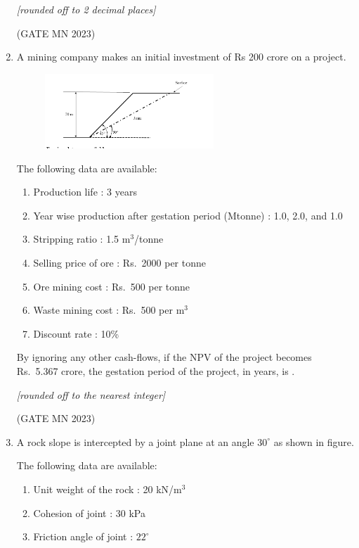 \documentclass[journal]{IEEEtran}
\begin{document}
\begin{enumerate}
\textit{[rounded off to 2 decimal places]}  


\hfill(GATE MN 2023)
\item A mining company makes an initial investment of Rs 200 crore on a project.  

    \begin{figure}[H]
    \centering
\includegraphics[width=0.6\textwidth]{Screenshot_2025_0822_133458.png}
\caption{}
    \label{fig:Q61}
\end{figure}
The following data are available:  
\begin{enumerate}
    \item Production life : 3 years  
    \item Year wise production after gestation period (Mtonne) : 1.0, 2.0, and 1.0  
    \item Stripping ratio : 1.5 m$^3$/tonne  
    \item Selling price of ore : Rs.\ 2000 per tonne  
    \item Ore mining cost : Rs.\ 500 per tonne  
    \item Waste mining cost : Rs.\ 500 per m$^3$  
    \item Discount rate : 10\%  
\end{enumerate}

By ignoring any other cash-flows, if the NPV of the project becomes Rs.\ 5.367 crore, the gestation period of the project, in years, is \underline{\hspace{2cm}}.  

\textit{[rounded off to the nearest integer]}  



\hfill(GATE MN 2023)
\item A rock slope is intercepted by a joint plane at an angle $30^\circ$ as shown in figure.  

The following data are available:  
\begin{enumerate}
    \item Unit weight of the rock : 20 kN/m$^3$  
    \item Cohesion of joint : 30 kPa  
    \item Friction angle of joint : $22^\circ$  
\end{enumerate}


\end{enumerate}
\end{document}
